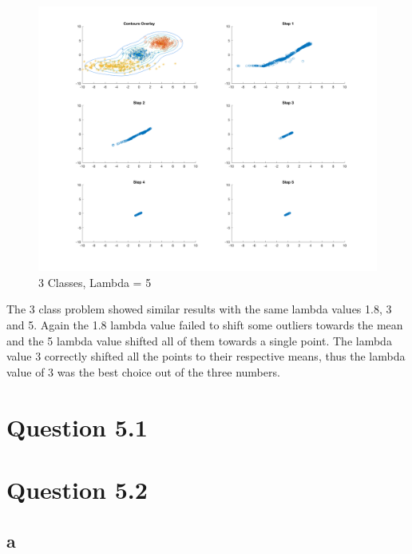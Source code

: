 \begin{figure}[H]
    \includegraphics[width=\linewidth]{../../pracs/week5/images/q3_3class_5}
    \centering
    \caption{3 Classes, Lambda = 5}
\end{figure}

The 3 class problem showed similar results with the same lambda values 1.8, 3 and 5.
Again the 1.8 lambda value failed to shift some outliers towards the mean and the 5 lambda value shifted all of them towards a single point.
The lambda value 3 correctly shifted all the points to their respective means, thus the lambda value of 3 was the best choice out of the three numbers.

\section*{Question 5.1}



\section*{Question 5.2}

\subsection*{a}

